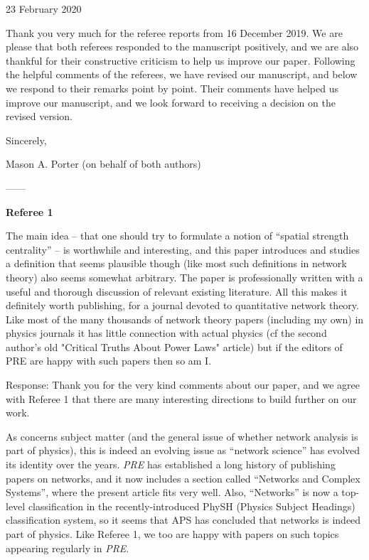 \documentclass[12pt]{article}
\begin{document}

23 February 2020

Thank you very much for the referee reports from 16 December 2019. We are please that both referees responded to the manuscript positively, and we are also thankful for their constructive criticism to help us improve our paper. Following the helpful comments of the referees, we have revised our manuscript, and below we respond to their remarks point by point. Their comments have helped us improve our manuscript, and we look forward to receiving a decision on the revised version.

Sincerely,

Mason A. Porter
(on behalf of both authors)

------



\textbf{Referee 1}

The main idea -- that one should try to formulate a notion of ``spatial
strength centrality'' -- is worthwhile and interesting, and this paper
introduces and studies a definition that seems plausible though (like
most such definitions in network theory) also seems somewhat
arbitrary. The paper is professionally written with a useful and
thorough discussion of relevant existing literature. All this makes it
definitely worth publishing, for a journal devoted to quantitative
network theory. Like most of the many thousands of network theory
papers (including my own) in physics journals it has little connection
with actual physics (cf the second author's old "Critical Truths About
Power Laws" article) but if the editors of PRE are happy with such
papers then so am I. 

{\color{res} Response: Thank you for the very kind comments about our paper, and we agree with Referee 1 that there are many interesting directions to build further on our work. 

As concerns subject matter (and the general issue of whether network analysis is part of physics), this is indeed an evolving issue as ``network science'' has evolved its identity over the years. \emph{PRE} has established a long history of publishing papers on networks, and it now includes a section called ``Networks and Complex Systems'', where the present article fits very well. Also, ``Networks'' is now a top-level classification in the recently-introduced PhySH (Physics Subject Headings) classification system, so it seems that APS has concluded that networks is indeed part of physics. Like Referee 1, we too are happy with papers on such topics appearing regularly in \emph{PRE}.}
\end{document}
